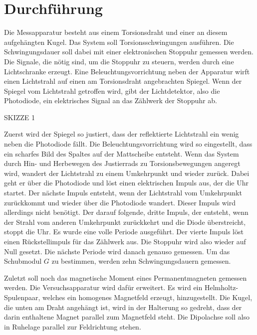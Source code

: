 \section{Durchführung}
Die Messapparatur besteht aus einem Torsionsdraht
und einer an diesem aufgehängten Kugel.
Das System soll Torsionsschwingungen ausführen.
Die Schwingungsdauer soll dabei mit einer
elektronischen Stoppuhr gemessen werden.
Die Signale, die nötig sind, um die Stoppuhr
zu steuern, werden durch eine Lichtschranke
erzeugt. Eine Beleuchtungsvorrichtung neben
der Apparatur wirft einen Lichtstrahl auf einen
am Torsionsdraht angebrachten Spiegel. Wenn
der Spiegel vom Lichtstrahl getroffen wird,
gibt der Lichtdetektor, also die Photodiode,
ein elektrisches Signal an das Zählwerk der
Stoppuhr ab.

\noindent SKIZZE 1

\noindent Zuerst wird der Spiegel so justiert, dass
der reflektierte Lichtstrahl ein wenig neben
die Photodiode fällt. Die Beleuchtungsvorrichtung
wird so eingestellt, dass ein scharfes Bild
des Spaltes auf der Mattscheibe entsteht.
Wenn das System durch Hin- und Herbewegen des
Justierrads zu Torsionsbewegungen angeregt
wird, wandert der Lichtstrahl zu einem Umkehrpunkt
und wieder zurück. Dabei geht er über die
Photodiode und löst einen elektrischen Impuls
aus, der die Uhr startet. Der nächste Impuls
entsteht, wenn der Lichtstrahl vom Umkehrpunkt
zurückkommt und wieder über die Photodiode
wandert. Dieser Impuls wird allerdings nicht
benötigt. Der darauf folgende, dritte Impuls, der 
entsteht, wenn der Strahl vom anderen Umkehrpunkt
zurückkehrt und die Diode überstreicht, stoppt
die Uhr. Es wurde eine volle Periode ausgeführt.
Der vierte Impuls löst einen Rückstellimpuls
für das Zählwerk aus. Die Stoppuhr wird also
wieder auf Null gesetzt. Die nächste Periode
wird danach genauso gemessen. Um das Schubmodul $G$ zu bestimmen, werden
zehn Schwingungsdauern gemessen.

\noindent Zuletzt soll noch das magnetische Moment eines
Permanentmagneten gemessen werden. Die Versuchsapparatur
wird dafür erweitert. Es wird ein Helmholtz-Spulenpaar,
welches ein homogenes Magnetfeld erzeugt, hinzugestellt. %
Die Kugel, die unten am Draht angehängt ist,
wird in der Halterung so gedreht, dass der darin enthaltene
Magnet parallel zum Magnetfeld steht. Die
Dipolachse soll also in Ruhelage parallel zur Feldrichtung
stehen.

